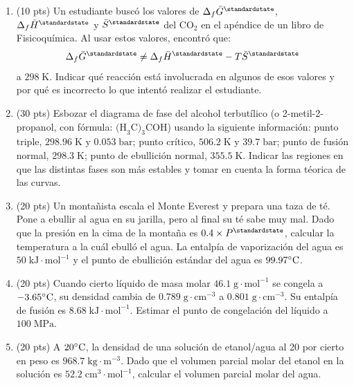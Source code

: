 \documentclass[a4paper,12pt]{article}
\begin{document}
\begin{enumerate}

 \item (10 pts) Un estudiante busc\'o los valores de $\Delta_f\bar{G}^\standardstate$, $\Delta_f\bar{H}^\standardstate$ y $\bar{S}^\standardstate$ del $\mbox{CO}_2$ en el ap\'endice de un libro de Fisicoqu\'imica. Al usar estos valores, encontr\'o que: 
$$\Delta_f\bar{G}^\standardstate\neq \Delta_f\bar{H}^\standardstate-T\bar{S}^\standardstate$$ 
a $298\;\mbox{K}$. Indicar qu\'e reacci\'on est\'a involucrada en algunos de esos valores y por qu\'e es incorrecto lo que intent\'o realizar el estudiante. %

 \item (30 pts) Esbozar el diagrama de fase del alcohol terbut\'ilico (o 2-metil-2-propanol, con f\'ormula: $\mbox{(H}_3\mbox{C)}_3\mbox{COH}$) usando la siguiente informaci\'on: punto triple, $298.96\;\mbox{K}$ y $0.053\;\mbox{bar}$; punto cr\'itico, $506.2\;\mbox{K}$ y $39.7\;\mbox{bar}$; punto de fusi\'on normal, $298.3\;\mbox{K}$; punto de ebullici\'on normal, $355.5\;\mbox{K}$. Indicar las regiones en que las distintas fases son m\'as estables y tomar en cuenta la forma t\'eorica de las curvas. %

 \item (20 pts) Un monta\~nista escala el Monte Everest y prepara una taza de t\'e. Pone a ebullir al agua en su jarilla, pero al final su t\'e sabe muy mal. Dado que la presi\'on en la cima de la monta\~na es $0.4\times P^\standardstate$, calcular la temperatura a la cu\'al ebull\'o el agua. La entalp\'ia de vaporizaci\'on del agua es $50\;\mbox{kJ}\cdot\mbox{mol}^{-1}$ y el punto de ebullici\'on est\'andar del agua es $99.97\celsius$. %

 \item (20 pts) Cuando cierto l\'iquido de masa molar $46.1\;\mbox{g}\cdot\mbox{mol}^{-1}$ se congela a $-3.65\celsius$, su densidad cambia de $0.789\;\mbox{g}\cdot\mbox{cm}^{-3}$ a $0.801\;\mbox{g}\cdot\mbox{cm}^{-3}$. Su entalp\'ia de fusi\'on es $8.68\;\mbox{kJ}\cdot\mbox{mol}^{-1}$. Estimar el punto de congelaci\'on del l\'iquido a $100\;\mbox{MPa}$. %

 \item (20 pts) A $20\celsius$, la densidad de una soluci\'on de etanol/agua al 20 por cierto en peso es $968.7\;\mbox{kg}\cdot\mbox{m}^{-3}$. Dado que el volumen parcial molar del etanol en la soluci\'on es $52.2\;\mbox{cm}^{3}\cdot\mbox{mol}^{-1}$, calcular el volumen parcial molar del agua. %

\end{enumerate}
\end{document}
